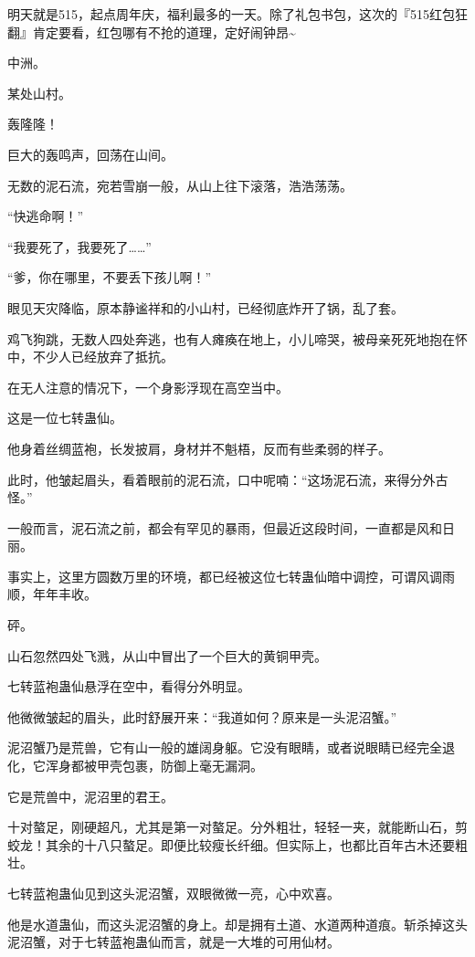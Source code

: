 
\begin{this_body}

明天就是515，起点周年庆，福利最多的一天。除了礼包书包，这次的『515红包狂翻』肯定要看，红包哪有不抢的道理，定好闹钟昂\~{}

中洲。

某处山村。

轰隆隆！

巨大的轰鸣声，回荡在山间。

无数的泥石流，宛若雪崩一般，从山上往下滚落，浩浩荡荡。

“快逃命啊！”

“我要死了，我要死了……”

“爹，你在哪里，不要丢下孩儿啊！”

眼见天灾降临，原本静谧祥和的小山村，已经彻底炸开了锅，乱了套。

鸡飞狗跳，无数人四处奔逃，也有人瘫痪在地上，小儿啼哭，被母亲死死地抱在怀中，不少人已经放弃了抵抗。

在无人注意的情况下，一个身影浮现在高空当中。

这是一位七转蛊仙。

他身着丝绸蓝袍，长发披肩，身材并不魁梧，反而有些柔弱的样子。

此时，他皱起眉头，看着眼前的泥石流，口中呢喃：“这场泥石流，来得分外古怪。”

一般而言，泥石流之前，都会有罕见的暴雨，但最近这段时间，一直都是风和日丽。

事实上，这里方圆数万里的环境，都已经被这位七转蛊仙暗中调控，可谓风调雨顺，年年丰收。

砰。

山石忽然四处飞溅，从山中冒出了一个巨大的黄铜甲壳。

七转蓝袍蛊仙悬浮在空中，看得分外明显。

他微微皱起的眉头，此时舒展开来：“我道如何？原来是一头泥沼蟹。”

泥沼蟹乃是荒兽，它有山一般的雄阔身躯。它没有眼睛，或者说眼睛已经完全退化，它浑身都被甲壳包裹，防御上毫无漏洞。

它是荒兽中，泥沼里的君王。

十对螯足，刚硬超凡，尤其是第一对螯足。分外粗壮，轻轻一夹，就能断山石，剪蛟龙！其余的十八只螯足。即便比较瘦长纤细。但实际上，也都比百年古木还要粗壮。

七转蓝袍蛊仙见到这头泥沼蟹，双眼微微一亮，心中欢喜。

他是水道蛊仙，而这头泥沼蟹的身上。却是拥有土道、水道两种道痕。斩杀掉这头泥沼蟹，对于七转蓝袍蛊仙而言，就是一大堆的可用仙材。


\end{this_body}
